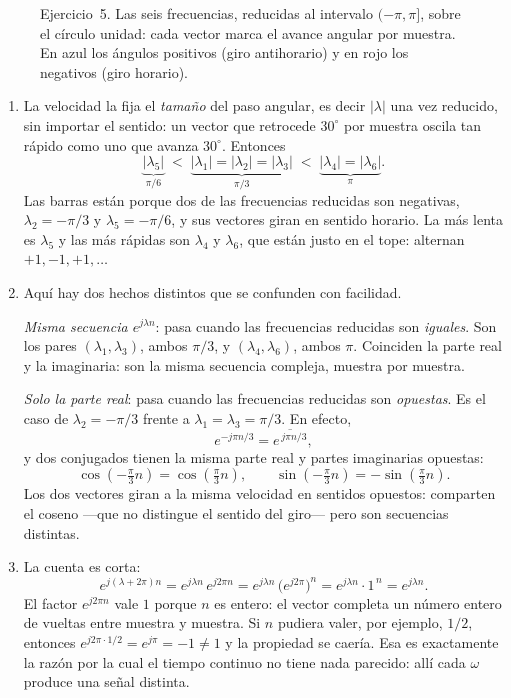 \documentclass[10pt,a4paper]{article}
\begin{document}
	\begin{figure}[H]
		\centering
		
		\caption{Ejercicio~5. Las seis frecuencias, reducidas al intervalo
		$(-\pi,\pi]$, sobre el círculo unidad: cada vector marca el avance angular por
		muestra. En azul los ángulos positivos (giro antihorario) y en rojo los
		negativos (giro horario).}
		\label{fig:sol_ej5}
	\end{figure}

	\begin{enumerate}
		\item La velocidad la fija el
		\emph{tamaño} del paso angular, es decir $|\lambda|$ una vez reducido, sin importar el
		sentido: un vector que retrocede $30^\circ$ por muestra oscila tan rápido como uno que
		avanza $30^\circ$. Entonces
		\[
			\underbrace{|\lambda_5|}_{\pi/6}
			\;<\;
			\underbrace{|\lambda_1| = |\lambda_2| = |\lambda_3|}_{\pi/3}
			\;<\;
			\underbrace{|\lambda_4| = |\lambda_6|}_{\pi}.
		\]
		Las barras están porque dos de las frecuencias reducidas son negativas,
		$\lambda_2 = -\pi/3$ y $\lambda_5 = -\pi/6$, y sus vectores giran en sentido horario.
		La más lenta es $\lambda_5$ y las más rápidas son $\lambda_4$ y $\lambda_6$, que están
		justo en el tope: alternan $+1,-1,+1,\dots$

		\item Aquí hay dos hechos distintos que se
		confunden con facilidad.

		\emph{Misma secuencia $e^{j\lambda n}$}: pasa cuando las frecuencias reducidas son
		\emph{iguales}. Son los pares $(\lambda_1,\lambda_3)$, ambos $\pi/3$, y
		$(\lambda_4,\lambda_6)$, ambos $\pi$. Coinciden la parte real y la imaginaria: son la
		misma secuencia compleja, muestra por muestra.

		\emph{Solo la parte real}: pasa cuando las frecuencias reducidas son \emph{opuestas}.
		Es el caso de $\lambda_2 = -\pi/3$ frente a $\lambda_1 = \lambda_3 = \pi/3$. En efecto,
		\[
			e^{-j\pi n/3} = \overline{e^{\,j\pi n/3}},
		\]
		y dos conjugados tienen la misma parte real y partes imaginarias opuestas:
		\[
			\cos(-\tfrac{\pi}{3}n) = \cos(\tfrac{\pi}{3}n),
			\qquad
			\sin(-\tfrac{\pi}{3}n) = -\sin(\tfrac{\pi}{3}n).
		\]
		Los dos vectores giran a la misma velocidad en sentidos opuestos: comparten el coseno
		---que no distingue el sentido del giro--- pero son secuencias distintas.

		\item La cuenta es corta:
		\[
			e^{j(\lambda+2\pi)n}
			= e^{j\lambda n}\,e^{j2\pi n}
			= e^{j\lambda n}\,\big(e^{j2\pi}\big)^{n}
			= e^{j\lambda n}\cdot 1^{\,n}
			= e^{j\lambda n}.
		\]
		El factor $e^{j2\pi n}$ vale $1$ porque $n$ es entero: el vector completa un número
		entero de vueltas entre muestra y muestra. Si $n$ pudiera valer, por ejemplo, $1/2$,
		entonces
		$e^{j2\pi\cdot 1/2}=e^{j\pi}=-1\neq 1$ y la propiedad se caería. Esa es exactamente la
		razón por la cual el tiempo continuo no tiene nada parecido: allí cada $\omega$ produce
		una señal distinta.
	\end{enumerate}
\end{document}
